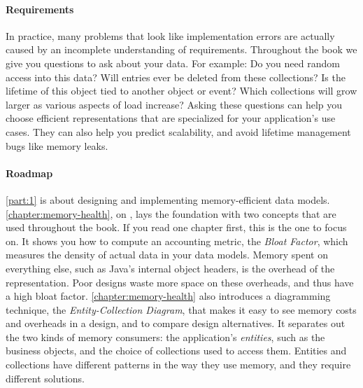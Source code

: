 \paragraph{Requirements}In practice, many problems that look like implementation
errors are actually caused by an incomplete understanding of requirements. Throughout the book we
give you questions to ask about your data. For example: Do you need random access into this data? Will entries ever be deleted from these collections? Is the lifetime of this object tied to another object or event? Which
collections will grow larger as various aspects of load increase?  Asking these
questions can help you choose efficient representations that are specialized for your application's use cases.
They can also help you predict scalability, and avoid lifetime management bugs
like memory leaks.




\paragraph{Roadmap}\autoref{part:1} is about designing and implementing
memory-efficient data models.
\autoref{chapter:memory-health}, on , lays the
foundation with two concepts that are used throughout the book. If you read one chapter first,
this is the one to focus on.
It shows you how to compute an accounting metric,
the \emph{Bloat Factor}, which measures the density of actual data in your
data models. Memory spent on everything else, such as
Java's internal object headers, is the overhead of the representation.
Poor designs waste more space on these overheads, and thus have a high bloat factor. \autoref{chapter:memory-health} also
introduces a diagramming technique,
the \emph{Entity-Collection Diagram}, that makes it easy to see memory costs and overheads in a design,
and to compare design alternatives.
It separates out the two kinds of memory consumers:
%
the application's \emph{entities}, such as the
business objects, and the choice of collections used to access them. Entities and collections have
different patterns in the way they use memory, and they require different solutions.

